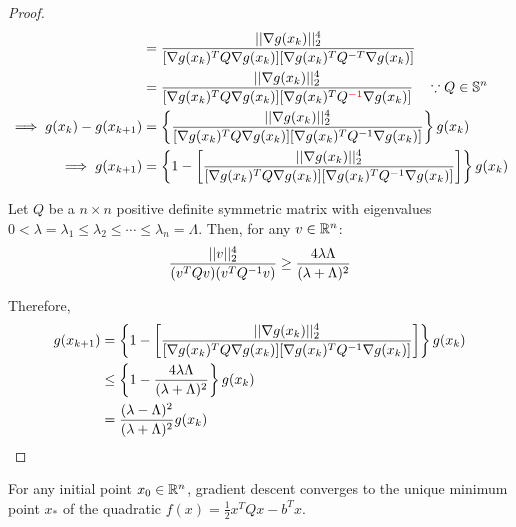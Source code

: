 \documentclass{article}
\begin{document}
\begin{proof}
\begin{align}
			&= \frac{\vert \vert {\nabla g(x_k)} \vert \vert_2^4}{[\nabla g(x_k)^T Q \nabla g(x_k)][\nabla g(x_k)^T Q^{-T} \nabla g(x_k)]} \\
			&=\frac{\vert \vert {\nabla g(x_k)} \vert \vert_2^4}{[\nabla g(x_k)^T Q \nabla g(x_k)][\nabla g(x_k)^T Q^{\textcolor{red}{-1}} \nabla g(x_k)]} \quad \because Q \in \mathbb{S}^n \\
			\implies g(x_k) - g(x_{k+1}) &= \left \{
				\frac{\vert \vert {\nabla g(x_k)} \vert \vert_2^4}{[\nabla g(x_k)^T Q \nabla g(x_k)][\nabla g(x_k)^T Q^{-1} \nabla g(x_k)]}
			\right \} g(x_k) \\
			\implies g(x_{k+1}) &= \left \{1 - \left [
				\frac{\vert \vert {\nabla g(x_k)} \vert \vert_2^4}{[\nabla g(x_k)^T Q \nabla g(x_k)][\nabla g(x_k)^T Q^{-1} \nabla g(x_k)]}
			\right ] \right \} g(x_k)
		\end{align}
		\begin{lemma}
			Let $Q$ be a $n\times n$ positive definite symmetric matrix with eigenvalues $0 < \lambda = \lambda_1 \leq \lambda_2 \leq \cdots \leq \lambda_n = \Lambda$. Then, for any $v \in \mathbb{R}^n$:
			\begin{align}
				\frac{\vert \vert {v} \vert \vert^4_2}{(v^T Q v)(v^T Q^{-1} v)} \geq \frac{4 \lambda \Lambda}{(\lambda + \Lambda)^2}
			\end{align}
		\end{lemma}
		Therefore, 
		\begin{align}
			g(x_{k+1}) &= \left \{1 - \left [
				\frac{\vert \vert {\nabla g(x_k)} \vert \vert_2^4}{[\nabla g(x_k)^T Q \nabla g(x_k)][\nabla g(x_k)^T Q^{-1} \nabla g(x_k)]}
			\right ] \right \} g(x_k) \\
			&\leq \left \{1 -  \frac{4 \lambda \Lambda}{(\lambda + \Lambda)^2} \right \} g(x_k) \\
			&= \frac{(\lambda - \Lambda)^2}{(\lambda + \Lambda)^2} g(x_k)
		\end{align}
	\end{proof}
	\begin{theorem}
		For any initial point $x_0 \in \mathbb{R}^n$, gradient descent converges to the unique minimum point $x_*$ of the quadratic $f(x) = \frac{1}{2} x^T Q x - b^T x$.
	\end{theorem}
	
\end{document}
